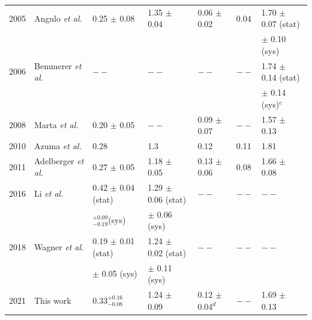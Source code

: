 \begin{table}
\begin{threeparttable}
\begin{tabular}{@{}lllllll@{}}
2005 & Angulo \textit{et al.} \cite{Angulo2005}                  & 0.25 $\pm$ 0.08                                 & 1.35 $\pm$ 0.04                         & 0.06 $\pm$ 0.02                & 0.04         & 1.70 $\pm$ 0.07 (stat)       \\
 & & & & & & $\pm$ 0.10 (sys) \\
2006 & Bemmerer \textit{et al.} \cite{Bemmerer2006}              & $--$                                            & $--$                                    & $--$                           & $--$         & 1.74 $\pm$ 0.14 (stat)  \\
 & & & & & & $\pm$ 0.14 (sys)$^{c}$ \\
2008 & Marta \textit{et al.} \cite{Marta2008}                    & 0.20 $\pm$ 0.05                                 & $--$                                    & 0.09 $\pm$ 0.07                & $--$         & 1.57 $\pm$ 0.13                               \\
2010 & Azuma \textit{et al.} \cite{Azuma2010}                    & 0.28                                            & 1.3                                     & 0.12                           & 0.11         & 1.81                                          \\
2011 & Adelberger \textit{et al.} \cite{Adelberger2011}          & 0.27 $\pm$ 0.05                                 & 1.18 $\pm$ 0.05                         & 0.13 $\pm$ 0.06                & 0.08         & 1.66 $\pm$ 0.08                               \\
2016 & Li \textit{et al.} \cite{Li2016}                          & 0.42 $\pm$ 0.04 (stat)   & 1.29 $\pm$ 0.06 (stat)  & $--$                           & $--$         & $--$                                          \\
 & & $^{+0.09}_{-0.19}$(sys) & $\pm$ 0.06 (sys) & & & \\
2018 & Wagner \textit{et al.} \cite{Wagner2018}                  & 0.19 $\pm$ 0.01 (stat)          & 1.24 $\pm$ 0.02 (stat) & $--$                           & $--$         & $--$                                          \\
 & & $\pm$ 0.05 (sys) &  $\pm$ 0.11 (sys)  & & & \\ 
2021 & This work                  & $0.33_{-0.08}^{+0.16} $           & 1.24 $\pm$ 0.09  &  0.12 $\pm$ 0.04$^{d}$              & $--$         & 1.69 $\pm$ 0.13 \\
 \bottomrule
\end{tabular}
\begin{tablenotes}

\end{tablenotes}
\end{threeparttable}
\end{table}
